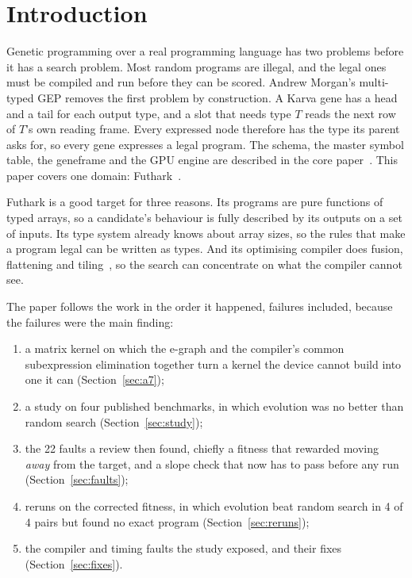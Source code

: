 \documentclass[sigconf,nonacm]{acmart}
\begin{document}

\maketitle

\section{Introduction}

Genetic programming over a real programming language has two problems before
it has a search problem. Most random programs are illegal, and the legal ones
must be compiled and run before they can be scored. Andrew Morgan's
multi-typed GEP removes the first problem by construction. A Karva gene has a
head and a tail for each output type, and a slot that needs type $T$ reads the
next row of $T$'s own reading frame. Every expressed node therefore has the type
its parent asks for, so every gene expresses a legal program. The schema,
the master symbol table, the geneframe and the GPU engine are described in
the core paper~\cite{morgan_core}. This paper covers one domain:
Futhark~\cite{henriksen2017futhark}.

Futhark is a good target for three reasons. Its programs are pure functions of
typed arrays, so a candidate's behaviour is fully described by its outputs on a
set of inputs. Its type system already knows about array sizes, so the rules
that make a program legal can be written as types. And its optimising compiler
does fusion, flattening and tiling~\cite{henriksen2019flattening}, so the search
can concentrate on what the compiler cannot see.

The paper follows the work in the order it happened, failures included,
because the failures were the main finding:
\begin{enumerate}
\item a matrix kernel on which the e-graph and the compiler's common
  subexpression elimination together turn a kernel the device cannot build into
  one it can (Section~\ref{sec:a7});
\item a study on four published benchmarks, in which evolution was no better
  than random search (Section~\ref{sec:study});
\item the 22 faults a review then found, chiefly a fitness that rewarded moving
  \emph{away} from the target, and a slope check that now has to pass before any
  run (Section~\ref{sec:faults});
\item reruns on the corrected fitness, in which evolution beat random search in
  4 of 4 pairs but found no exact program (Section~\ref{sec:reruns});
\item the compiler and timing faults the study exposed, and their fixes
  (Section~\ref{sec:fixes}).
\end{enumerate}
\end{document}
